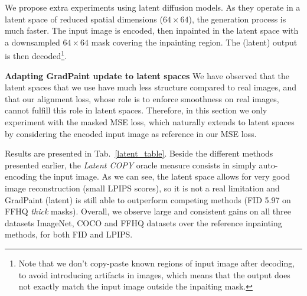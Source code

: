 We propose extra experiments using latent diffusion models. As they operate in a latent space of reduced spatial dimensions ($64\times64$), the generation process is much faster. The input image is encoded, then inpainted in the latent space with a downsampled $64\times64$ mask covering the inpainting region. The (latent) output is then decoded\footnote{Note that we don't copy-paste known regions of input image after decoding, to avoid introducing artifacts in images, which means that the output does not exactly match the input image outside the inpaiting mask.}.

\noindent \textbf{Adapting GradPaint update to latent spaces} We have observed that the latent spaces that we use have much less structure compared to real images, and that our alignment loss, whose role is to enforce smoothness on real images, cannot fulfill this role in latent spaces. Therefore, in this section we only experiment with the masked MSE loss, which naturally extends to latent spaces by considering the encoded input image as reference in our MSE loss.

 Results are presented in Tab.~\ref{latent_table}. Beside the different methods presented earlier, the \textit{Latent COPY} oracle measure consists in simply auto-encoding the input image. As we can see, the latent space allows for very good image reconstruction (small LPIPS scores), so it is not a real limitation and GradPaint (latent) is still able to outperform competing methods (FID 5.97 on FFHQ \emph{thick} masks). Overall, we observe large and consistent gains on all three datasets ImageNet, COCO and FFHQ datasets over the reference inpainting methods, for both FID and LPIPS.















